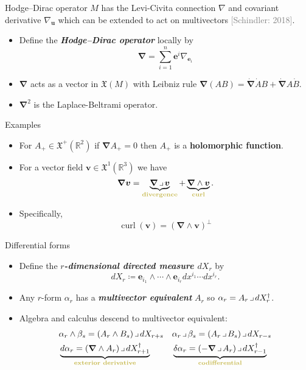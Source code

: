 \documentclass[aspectratio=169]{beamer}
\newcommand\boldgreen[1]{\textcolor{lighter_csu_green}{\emph{\textbf{#1}}}}
\newcommand\boldgold[1]{\textcolor{csu_gold}{\textbf{#1}}}
\newcommand\grey[1]{\textcolor{gray}{#1}}
\newcommand{\R}{\mathbb{R}}
\newcommand{\grad}{\boldsymbol{\nabla}}
\newcommand{\blade}[1]{\boldsymbol{#1}}
\newcommand{\contract}{\hspace*{.5mm} \lrcorner \hspace*{.5mm}}
\newcommand{\smoothfields}{\mathfrak{X}}
\begin{document}
\begin{frame}{Hodge--Dirac operator}
\vfill
\pause
    $M$ has the Levi-Civita connection $\nabla$ and covariant derivative $\nabla_{\blade{u}}$ which can be extended to act on multivectors \grey{[Schindler: 2018]}.
    \pause
    \begin{itemize}
        \item Define the \boldgreen{Hodge--Dirac operator} locally by
        \[
        \grad = \sum_{i=1}^n \blade{e}^i \nabla_{\blade{e}_i}
        \]
        \pause
        \item $\grad$ acts as a vector in $\smoothfields(M)$ with Leibniz rule $\grad(AB) = \dot{\grad}\dot{A}B + \dot{\grad}A\dot{B}$.
        \pause
        \item $\grad^2$ is the Laplace-Beltrami operator.
    \end{itemize}
\vfill
\end{frame}

\begin{frame}{Examples}
\vfill
\begin{itemize}
\pause
\item For $A_+ \in \smoothfields^+(\R^2)$ if $\grad A_+=0$ then $A_+$ is a \boldgold{holomorphic function}.
\pause
\item For a vector field $\blade{v}\in \smoothfields^1(\R^3)$ we have
    \[
    \grad \blade{v} = \underbrace{\grad \contract \blade{v}}_{\textrm{\boldgold{divergence}}} + \underbrace{\grad \wedge \blade{v}}_{\textrm{\boldgold{curl}}}.
    \]
\pause
\item Specifically,
\[
    \operatorname{curl}(\blade{v}) = (\grad \wedge \blade{v})^\perp
\]
\end{itemize}
\vfill
\end{frame}

\begin{frame}{Differential forms}
\vfill
\begin{itemize}
    \pause
    \item Define the \boldgreen{$r$-dimensional directed measure $dX_r$} by
    \[
    dX_r\coloneqq \blade{e}_{i_1} \wedge \cdots \wedge \blade{e}_{i_r} dx^{i_1} \cdots dx^{i_r}.
    \]
    \pause
    \item Any $r$-form $\alpha_r$ has a \boldgreen{multivector equivalent} $A_r$ so $\alpha_r = A_r \contract dX_r^\dagger$.
    \pause
    \item Algebra and calculus descend to multivector equivalent:
    \begin{align*}
    &\alpha_r \wedge \beta_s = (A_r \wedge B_s) \contract dX_{r+s} & &\alpha_r \contract \beta_s = (A_r \contract B_s) \contract dX_{r-s} \\
  &\underbrace{d\alpha_r = (\grad \wedge A_r) \contract dX_{r+1}^\dagger}_{\textrm{\boldgold{exterior derivative}}} & &\underbrace{\delta \alpha_r = (-\grad \contract A_r) \contract dX_{r-1}^\dagger}_{\textrm{\boldgold{codifferential}}}
    \end{align*}
\end{itemize}
\vfill
\end{frame}
\end{document}

